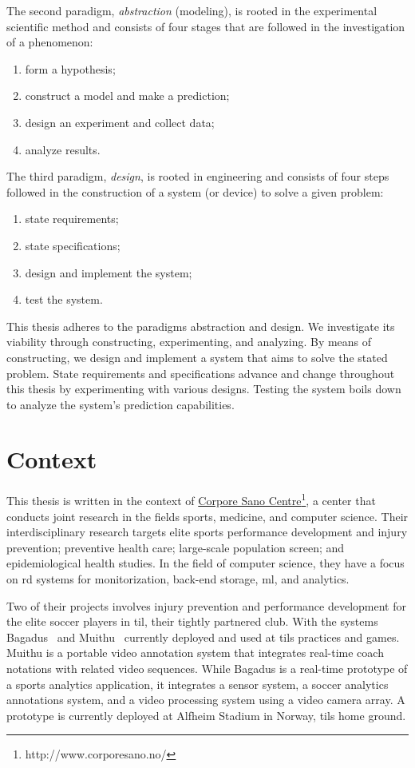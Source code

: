 The second paradigm, \emph{abstraction} (modeling), is rooted in the experimental scientific method and consists of four stages that are followed in the investigation of a phenomenon: 
\begin{enumerate}
    \item form a hypothesis;
    \item construct a model and make a prediction;
    \item design an experiment and collect data;
    \item analyze results.
\end{enumerate}

The third paradigm, \emph{design}, is rooted in engineering and consists of four steps followed in the construction of a system (or device) to solve a given problem:
\begin{enumerate}
    \item state requirements; 
    \item state specifications;
    \item design and implement the system;
    \item test the system.
\end{enumerate}

This thesis adheres to the paradigms abstraction and design. We investigate its viability through constructing, experimenting, and analyzing. By means of constructing, we design and implement a system that aims to solve the stated problem. State requirements and specifications advance and change throughout this thesis by experimenting with various designs. Testing the system boils down to analyze the system's prediction capabilities.

\section{Context}\label{sec:context}
This thesis is written in the context of \href{http://www.corporesano.no/}{Corpore Sano Centre}\footnote{http://www.corporesano.no/}, a center that conducts joint research in the fields sports, medicine, and computer science. Their interdisciplinary research targets elite sports performance development and injury prevention; preventive health care; large-scale population screen; and epidemiological health studies. In the field of computer science, they have a focus on \ac{rd} systems for monitorization, back-end storage, \ac{ml}, and analytics.

Two of their projects involves injury prevention and performance development for the elite soccer players in \ac{til}, their tightly partnered club. With the systems Bagadus~\cite{halvorsen2013bagadus} and Muithu~\cite{johansen2012muithu} currently deployed and used at \acp{til} practices and games. Muithu is a portable video annotation system that integrates real-time coach notations with related video sequences. While Bagadus is a real-time prototype of a sports analytics application, it integrates a sensor system, a soccer analytics annotations system, and a video processing system using a video camera array. A prototype is currently deployed at Alfheim Stadium in Norway, \acp{til} home ground.

